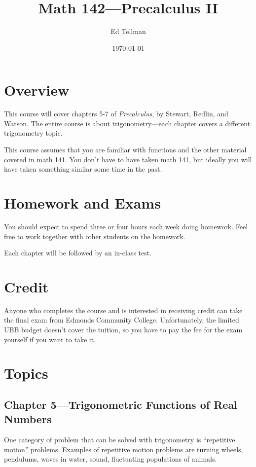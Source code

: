 \documentclass[fleqn, onecolumn]{article}
\author{Ed Tellman}
\title{Math 142---Precalculus II}
\date{\today}
\begin{document}
  \maketitle

  \section{Overview}
  This course will cover chapters 5-7 of {\em Precalculus}, by Stewart, Redlin, and Watson.  The entire course is about
  trigonometry---each chapter covers a different trigonometry topic.

  This course assumes that you are familiar with functions and the other material covered in math 141.  You don't have
  to have taken math 141, but ideally you will have taken something similar some time in the past.

  \section{Homework and Exams}

  You should expect to spend three or four hours each week doing homework.  Feel free to work together with other students
  on the homework.

  Each chapter will be followed by an in-class test.  

  \section{Credit}
  Anyone who completes the course and is interested in receiving credit can take the final exam from Edmonds Community
  College.  Unfortunately, the limited UBB budget doesn't cover the tuition, so you have to pay the fee for the exam
  yourself if you want to take it.

  \section{Topics}

  \subsection{Chapter 5---Trigonometric Functions of Real Numbers}

  One category of problem that can be solved with trigonometry is ``repetitive motion'' problems.  Examples of
  repetitive motion problems are turning wheels, pendulums, waves in water, sound, fluctuating populations of animals.
\end{document}
